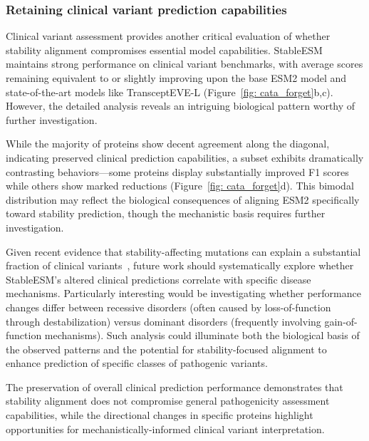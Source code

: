 \documentclass[]{fairmeta}
\begin{document}
\subsubsection{Retaining clinical variant prediction capabilities}

Clinical variant assessment provides another critical evaluation of whether stability alignment compromises essential model capabilities. StableESM maintains strong performance on clinical variant benchmarks, with average scores remaining equivalent to or slightly improving upon the base ESM2 model and state-of-the-art models like TransceptEVE-L (Figure~\ref{fig: cata_forget}b,c). However, the detailed analysis reveals an intriguing biological pattern worthy of further investigation.

While the majority of proteins show decent agreement along the diagonal, indicating preserved clinical prediction capabilities, a subset exhibits dramatically contrasting behaviors—some proteins display substantially improved F1 scores while others show marked reductions (Figure~\ref{fig: cata_forget}d). This bimodal distribution may reflect the biological consequences of aligning ESM2 specifically toward stability prediction, though the mechanistic basis requires further investigation.

Given recent evidence that stability-affecting mutations can explain a substantial fraction of clinical variants~\citep{beltran2025site}, future work should systematically explore whether StableESM's altered clinical predictions correlate with specific disease mechanisms. Particularly interesting would be investigating whether performance changes differ between recessive disorders (often caused by loss-of-function through destabilization) versus dominant disorders (frequently involving gain-of-function mechanisms). Such analysis could illuminate both the biological basis of the observed patterns and the potential for stability-focused alignment to enhance prediction of specific classes of pathogenic variants.

The preservation of overall clinical prediction performance demonstrates that stability alignment does not compromise general pathogenicity assessment capabilities, while the directional changes in specific proteins highlight opportunities for mechanistically-informed clinical variant interpretation.
\end{document}
